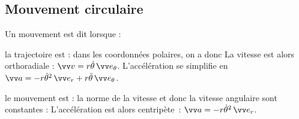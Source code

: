 \documentclass[12pt,fancy]{cours}
\begin{document}
\subsection{Mouvement circulaire} 
Un mouvement est dit  lorsque :
\begin{liste}
\item la trajectoire est  : dans les coordonnées polaires, on a donc
La vitesse est alors orthoradiale : $\Vec{v} = r\dot{\theta}\,\et $. L'accélération se simplifie en $\Vec{a}= -r\dot{\theta}^{2}\,\er + r \ddot{\theta} \,\et$.
\item le mouvement est  : la norme de la vitesse et donc la vitesse angulaire sont constantes :
L'accélération est alors centripète~: $\Vec{a}= -r\dot{\theta}^{2}\,\er $.
\end{liste}



\end{document}
